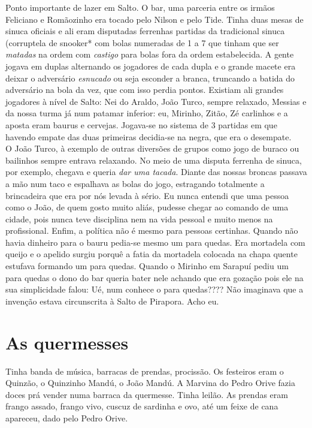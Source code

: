 \documentclass[12pt,brazil,]{book}
\begin{document}
Ponto importante de lazer em Salto. O bar, uma parceria entre os irmãos
Feliciano e Romãozinho era tocado pelo Nilson e pelo Tide. Tinha duas
mesas de sinuca oficiais e ali eram disputadas ferrenhas partidas da
tradicional sinuca (corruptela de snooker* com bolas numeradas de 1 a 7
que tinham que ser \emph{matadas} na ordem com \emph{castigo} para bolas
fora da ordem estabelecida. A gente jogava em duplas alternando os
jogadores de cada dupla e o grande macete era deixar o adversário
\emph{esnucado} ou seja esconder a branca, truncando a batida do
adversário na bola da vez, que com isso perdia pontos. Existiam ali
grandes jogadores à nível de Salto: Nei do Araldo, João Turco, sempre
relaxado, Messias e da nossa turma já num patamar inferior: eu, Mirinho,
Zitão, Zé carlinhos e a aposta eram baurus e cervejas. Jogava-se no
sistema de 3 partidas em que havendo empate das duas primeiras
decidia-se na negra, que era o desempate.\\
O João Turco, à exemplo de outras diversões de grupos como jogo de
buraco ou bailinhos sempre entrava relaxando. No meio de uma disputa
ferrenha de sinuca, por exemplo, chegava e queria \emph{dar uma tacada}.
Diante das nossas broncas passava a mão num taco e espalhava as bolas do
jogo, estragando totalmente a brincadeira que era por nós levada à
sério. Eu nunca entendi que uma pessoa como o João, de quem gosto muito
aliás, pudesse chegar ao comando de uma cidade, pois nunca teve
disciplina nem na vida pessoal e muito menos na profissional. Enfim, a
política não é mesmo para pessoas certinhas. Quando não havia dinheiro
para o bauru pedia-se mesmo um para quedas. Era mortadela com queijo e o
apelido surgiu porquê a fatia da mortadela colocada na chapa quente
estufava formando um para quedas. Quando o Mirinho em Sarapuí pediu um
para quedas o dono do bar queria bater nele achando que era gozação pois
ele na sua simplicidade falou: Ué, num conhece o para quedas???? Não
imaginava que a invenção estava circunscrita à Salto de Pirapora. Acho
eu.

\section{As quermesses}\label{as-quermesses}

Tinha banda de música, barracas de prendas, procissão. Os festeiros eram
o Quinzão, o Quinzinho Mandú, o João Mandú. A Marvina do Pedro Orive
fazia doces prá vender numa barraca da quermesse. Tinha leilão. As
prendas eram frango assado, frango vivo, cuscuz de sardinha e ovo, até
um feixe de cana apareceu, dado pelo Pedro Orive.
\end{document}
